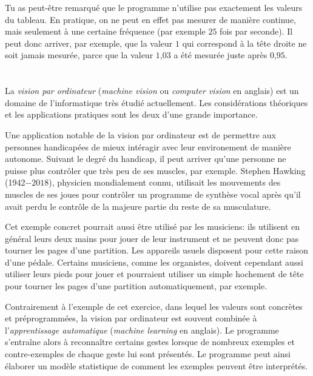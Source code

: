{{Tu as peut-être remarqué que le programme n’utilise pas exactement les valeurs du tableau. En pratique, on ne peut en effet pas mesurer de manière continue, mais seulement à une certaine fréquence (par exemple $25$ fois par seconde). Il peut donc arriver, par exemple, que la valeur $1$ qui correspond à la tête droite ne soit jamais mesurée, parce que la valeur $1$,$03$ a été mesurée juste après $0$,$95$.



\section*{\BrochureItsInformatics}
La \emph{vision par ordinateur} (\emph{machine vision} ou \emph{computer vision} en anglais) est un domaine de l’informatique très étudié actuellement. Les considérations théoriques et les applications pratiques sont les deux d’une grande importance.

Une application notable de la vision par ordinateur est de permettre aux personnes handicapées de mieux intéragir avec leur environement de manière autonome. Suivant le degré du handicap, il peut arriver qu’une personne ne puisse plus contrôler que très peu de ses muscles, par exemple. Stephen Hawking (1942$-2018$), physicien mondialement connu, utilisait les mouvements des muscles de ses joues pour contrôler un programme de synthèse vocal après qu’il avait perdu le contrôle de la majeure partie du reste de sa musculature.

Cet exemple concret pourrait aussi être utilisé par les musiciens: ils utilisent en général leurs deux mains pour jouer de leur instrument et ne peuvent donc pas tourner les pages d’une partition. Les appareils usuels disposent pour cette raison d’une pédale. Certains musiciens, comme les organistes, doivent cependant aussi utiliser leurs pieds pour jouer et pourraient utiliser un simple hochement de tête pour tourner les pages d’une partition automatiquement, par exemple.

Contrairement à l’exemple de cet exercice, dans lequel les valeurs sont concrètes et préprogrammées, la vision par ordinateur est souvent combinée à l’\emph{apprentissage automatique} (\emph{machine learning} en anglais). Le programme s’entraîne alors à reconnaître certains gestes lorsque de nombreux exemples et contre-exemples de chaque geste lui sont présentés. Le programme peut ainsi élaborer un modèle statistique de comment les exemples peuvent être interprétés.



}}
